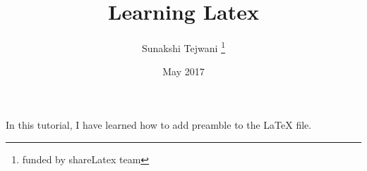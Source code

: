 \documentclass[12pt, letterpaper, twoside]{article}
\title{Learning Latex}
\author{Sunakshi Tejwani \thanks{funded by shareLatex team}}
\date{May 2017}
\begin{document}
\maketitle
In this tutorial, I have learned how to add preamble to the \LaTeX{} file.
\end{document}
